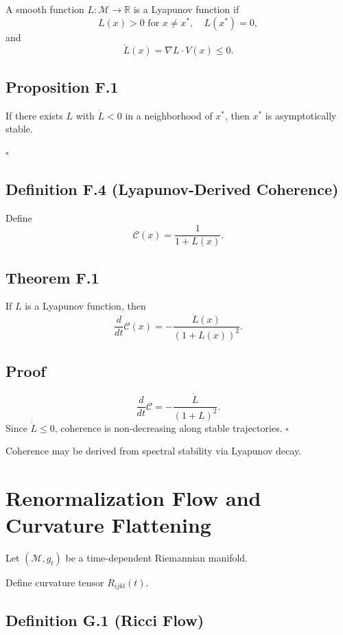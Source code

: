 \documentclass[12pt]{article}
\begin{document}
A smooth function $L : \mathcal{M} \to \mathbb{R}$ is a Lyapunov function if
\[
L(x) > 0 \text{ for } x \neq x^\ast,
\quad
L(x^\ast) = 0,
\]
and
\[
\dot{L}(x) = \nabla L \cdot V(x) \le 0.
\]

\subsection*{Proposition F.1}

If there exists $L$ with $\dot{L} < 0$ in a neighborhood of $x^\ast$, then $x^\ast$ is asymptotically stable.

\hfill $\square$

\subsection*{Definition F.4 (Lyapunov-Derived Coherence)}

Define
\[
\mathcal{C}(x)
=
\frac{1}{1 + L(x)}.
\]

\subsection*{Theorem F.1}

If $L$ is a Lyapunov function, then
\[
\frac{d}{dt} \mathcal{C}(x)
=
-\frac{\dot{L}(x)}{(1+L(x))^2}.
\]

\subsection*{Proof}

\[
\frac{d}{dt} \mathcal{C}
=
-\frac{\dot{L}}{(1+L)^2}.
\]
Since $\dot{L} \le 0$, coherence is non-decreasing along stable trajectories.
\hfill $\square$

Coherence may be derived from spectral stability via Lyapunov decay.

\section{Renormalization Flow and Curvature Flattening}

Let $(\mathcal{M}, g_t)$ be a time-dependent Riemannian manifold.

Define curvature tensor $R_{ijkl}(t)$.

\subsection*{Definition G.1 (Ricci Flow)}
\end{document}
